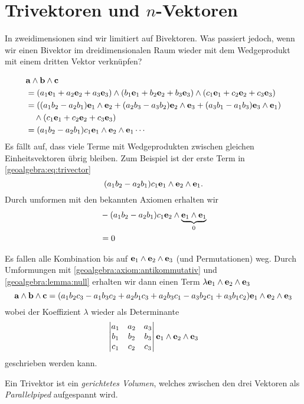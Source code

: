 \section{Trivektoren und $n$-Vektoren}
In zweidimensionen sind wir limitiert auf Bivektoren. Was passiert jedoch, wenn wir einen Bivektor
im dreidimensionalen Raum wieder mit dem Wedgeprodukt mit einem dritten Vektor verknüpfen?

{
\renewcommand{\a}{\mathbf{a}}
\renewcommand{\b}{\mathbf{b}}
\renewcommand{\c}{\mathbf{c}}
\begin{equation} 
\begin{aligned}
&\a \wedge \b \wedge \c \\ 
&= (a_1 \eone + a_2 \etwo + a_3 \ethree) \wedge (b_1 \eone + b_2 \etwo + b_3 \ethree) \wedge (c_1 \eone + c_2 \etwo + c_3 \ethree) \\
&= ((a_1 b_2 - a_2 b_1) \eone \wedge \etwo +(a_2 b_3 - a_3 b_2) \etwo \wedge \ethree +(a_3 b_1 - a_1 b_3) \ethree \wedge \eone) \\
&\quad\wedge (c_1 \eone + c_2 \etwo + c_3 \ethree) \\
&= (a_1 b_2 - a_2 b_1) c_1 \eone \wedge \etwo \wedge \eone \cdots
\end{aligned}
\label{geoalgebra:eq:trivector}
\end{equation}
Es fällt auf, dass viele Terme mit Wedgeprodukten zwischen gleichen Einheitsvektoren übrig bleiben. Zum Beispiel ist der erste Term in \eqref{geoalgebra:eq:trivector}
\begin{equation}
(a_1 b_2 - a_2 b_1) c_1 \mathbf{e}_1 \wedge \mathbf{e}_2 \wedge \mathbf{e}_1.
\end{equation}
Durch umformen mit den bekannten Axiomen erhalten wir
\begin{equation}
\begin{aligned}
&-(a_1 b_2 - a_2 b_1) c_1 \mathbf{e}_2 \wedge \underbrace{\mathbf{e}_1 \wedge \mathbf{e}_1}_{0} \\
&=0
\end{aligned}
\end{equation}

Es fallen alle Kombination bis auf $\mathbf{e}_1 \wedge \mathbf{e}_2 \wedge \mathbf{e}_3$ (und Permutationen) weg.
Durch Umformungen mit \eqref{geoalgebra:axiom:antikommutativ} und
\eqref{geoalgebra:lemma:null} erhalten wir dann einen Term $\lambda \mathbf{e}_1 \wedge \mathbf{e}_2 \wedge \mathbf{e}_3$
\begin{equation}
\a \wedge \b \wedge \c = (a_1 b_2 c_3 - a_1 b_3 c_2 + a_2 b_1 c_3 + a_2 b_3 c_1 - a_3 b_2 c_1 + a_3 b_1 c_2) \eone \wedge \etwo \wedge \ethree
\end{equation}
wobei der Koeffizient $\lambda$ wieder als Determinante
\begin{equation}
\begin{vmatrix} a_1 & a_2 & a_3 \\ b_1 & b_2 & b_3 \\ c_1 & c_2 & c_3 \end{vmatrix} \mathbf{e}_1 \wedge \mathbf{e}_2 \wedge \mathbf{e}_3
\end{equation}
geschrieben werden kann.

Ein Trivektor ist ein \emph{gerichtetes Volumen}, welches zwischen den drei Vektoren als \emph{Parallelpiped} aufgespannt wird.
}
